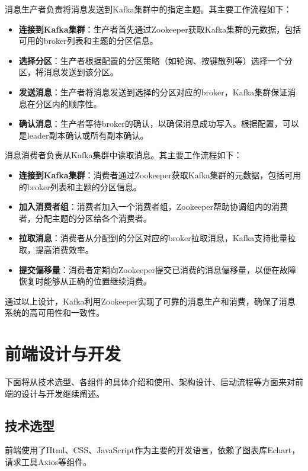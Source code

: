 \documentclass[oneside]{xduugthesis}
\begin{document}
消息生产者负责将消息发送到Kafka集群中的指定主题。其主要工作流程如下：

\begin{itemize}[nosep]
    \item \textbf{连接到Kafka集群}：生产者首先通过Zookeeper获取Kafka集群的元数据，包括可用的broker列表和主题的分区信息。
    \item \textbf{选择分区}：生产者根据配置的分区策略（如轮询、按键散列等）选择一个分区，将消息发送到该分区。
    \item \textbf{发送消息}：生产者将消息发送到选择的分区对应的broker，Kafka集群保证消息在分区内的顺序性。
    \item \textbf{确认消息}：生产者等待broker的确认，以确保消息成功写入。根据配置，可以是leader副本确认或所有副本确认。
\end{itemize}

消息消费者负责从Kafka集群中读取消息。其主要工作流程如下：

\begin{itemize}[nosep]
    \item \textbf{连接到Kafka集群}：消费者通过Zookeeper获取Kafka集群的元数据，包括可用的broker列表和主题的分区信息。
    \item \textbf{加入消费者组}：消费者加入一个消费者组，Zookeeper帮助协调组内的消费者，分配主题的分区给各个消费者。
    \item \textbf{拉取消息}：消费者从分配到的分区对应的broker拉取消息，Kafka支持批量拉取，提高消费效率。
    \item \textbf{提交偏移量}：消费者定期向Zookeeper提交已消费的消息偏移量，以便在故障恢复时能够从正确的位置继续消费。
\end{itemize}

通过以上设计，Kafka利用Zookeeper实现了可靠的消息生产和消费，确保了消息系统的高可用性和一致性。

\section{前端设计与开发}

下面将从技术选型、各组件的具体介绍和使用、架构设计、启动流程等方面来对前端的设计与开发继续阐述。

\subsection{技术选型}

前端使用了Html、CSS、JavaScript作为主要的开发语言，依赖了图表库Echart，请求工具Axios等组件。
\end{document}
